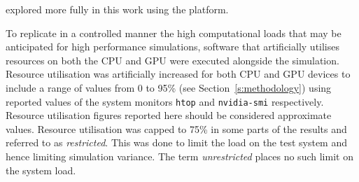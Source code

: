 \DIFdelend \DIFaddbegin {}\DIFaddend explored more fully in this work using the \DIFdelbegin {}\DIFdelend \DIFaddbegin {}\DIFaddend platform. 

\DIFaddbegin 


\DIFaddend To replicate in a controlled manner the high computational loads that may be anticipated for high performance simulations, software that artificially utilises resources on both the CPU and GPU were executed alongside the simulation. Resource utilisation was artificially increased for both CPU and GPU devices to include a range of values from 0 to 95\% (see Section~\ref{s:methodology}) using reported values of the system monitors \texttt{htop} and \texttt{nvidia-smi} respectively. Resource utilisation figures reported here should be considered approximate values. Resource utilisation was capped to 75\% in some parts of the results and referred to as \textit{restricted}. This was done to limit the load on the test system and hence limiting simulation variance. The term \textit{unrestricted} places no such limit on the system load.

